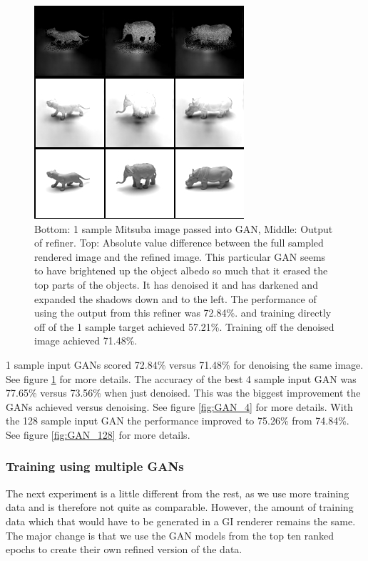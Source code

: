 \documentclass[10pt,twocolumn,letterpaper]{article}
\begin{document}
\begin{figure}[h!]
\centering
\includegraphics[width=1.0\columnwidth]{./assets/1sampleGANComparison_72_84.png}
\caption{Bottom: 1 sample Mitsuba image passed into GAN, Middle: Output of refiner.  Top: Absolute value difference between the full sampled rendered image and the refined image. This particular GAN seems to have brightened up the object albedo so much that it erased the top parts of the objects. It has denoised it and has darkened and expanded the shadows down and to the left.  The performance of using the output from this refiner was 72.84\%. and training directly off of the 1 sample target achieved 57.21\%.  Training off the denoised image achieved 71.48\%.}
\label{fig:GAN_1}
\end{figure}
1 sample input GANs scored 72.84\% versus 71.48\% for denoising the same image. See figure \ref{fig:GAN_1} for more details.  The accuracy of the best 4 sample input GAN was 77.65\% versus 73.56\% when just denoised. This was the biggest improvement the GANs achieved versus denoising. See figure \ref{fig:GAN_4} for more details.  With the 128 sample input GAN the performance improved to 75.26\% from 74.84\%. See figure \ref{fig:GAN_128} for more details.
\subsubsection{Training using multiple GANs} \label{sec:multigans}
The next experiment is a little different from the rest, as we use more training data and is therefore not quite as comparable.  However, the amount of training data which that would have to be generated in a GI renderer remains the same.  The major change is that we use the GAN models from the top ten ranked epochs to create their own refined version of the data.
\end{document}
